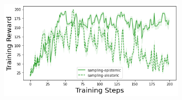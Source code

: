 \begin{figure}
\begin{subfigure}{.24\textwidth}
    \end{subfigure}
    \begin{subfigure}{.24\textwidth}
        \includegraphics[width=\textwidth]{sections/011_icml2022/resources/cartpole-training_total_reward-postnet-training-strategy.png}
    \end{subfigure}
    

\end{figure}
